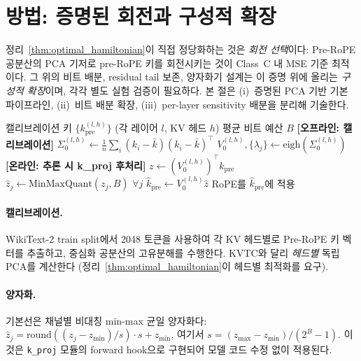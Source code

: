 \section{방법: 증명된 회전과 구성적 확장}
\label{sec:method}

정리~\ref{thm:optimal_hamiltonian}이 직접 정당화하는 것은 \emph{회전 선택}이다: Pre-RoPE 공분산의 PCA 기저로 pre-RoPE 키를 회전시키는 것이 Class~C 내 MSE 기준 최적이다. 그 위의 비트 배분, residual tail 보존, 양자화기 설계는 이 증명 위에 올리는 \emph{구성적 확장}이며, 각각 별도 실험 검증이 필요하다. 본 절은 (i)~증명된 PCA 기반 기본 파이프라인, (ii)~비트 배분 확장, (iii)~per-layer sensitivity 배분을 분리해 기술한다.

\begin{algorithm}[t]
\caption{Pre-RoPE PCA 기반 기본 양자화 파이프라인}
\label{alg:pipeline}
\begin{algorithmic}[1]
\REQUIRE 캘리브레이션 키 $\{k^{(l,h)}_{\mathrm{pre}}\}$ (각 레이어 $l$, KV 헤드 $h$)
\REQUIRE 평균 비트 예산 $B$
\STATE \textbf{[오프라인: 캘리브레이션]}
  \STATE $\Sigma_0^{(l,h)} \leftarrow \frac{1}{n}\sum_i (k_i - \bar{k})(k_i - \bar{k})^\top$ 
  \STATE $V_0^{(l,h)}, \{\lambda_j\} \leftarrow \mathrm{eigh}(\Sigma_0^{(l,h)})$ 
\ENDFOR
\STATE \textbf{[온라인: 추론 시 k\_proj 후처리]}
  \STATE $z \leftarrow (V_0^{(l,h)})^\top k_{\mathrm{pre}}$ 
  \STATE $\hat{z}_j \leftarrow \mathrm{MinMaxQuant}(z_j, B)$ \quad $\forall j$ 
  \STATE $\hat{k}_{\mathrm{pre}} \leftarrow V_0^{(l,h)} \hat{z}$ 
  \STATE RoPE를 $\hat{k}_{\mathrm{pre}}$에 적용 
\ENDFOR
\end{algorithmic}
\end{algorithm}

\paragraph{캘리브레이션.} WikiText-2 train split에서 2048 토큰을 사용하여 각 KV 헤드별로 Pre-RoPE 키 벡터를 추출하고, 중심화 공분산의 고유분해를 수행한다. KVTC와 달리 \emph{헤드별} 독립 PCA를 계산한다 (정리~\ref{thm:optimal_hamiltonian}이 헤드별 최적화를 요구).

\paragraph{양자화.} 기본선은 채널별 비대칭 min-max 균일 양자화다: $\hat{z}_j = \mathrm{round}((z_j - z_{\min}) / s) \cdot s + z_{\min}$, 여기서 $s = (z_{\max} - z_{\min}) / (2^B - 1)$. 이것은 \texttt{k\_proj} 모듈의 forward hook으로 구현되어 모델 코드 수정 없이 적용된다.

